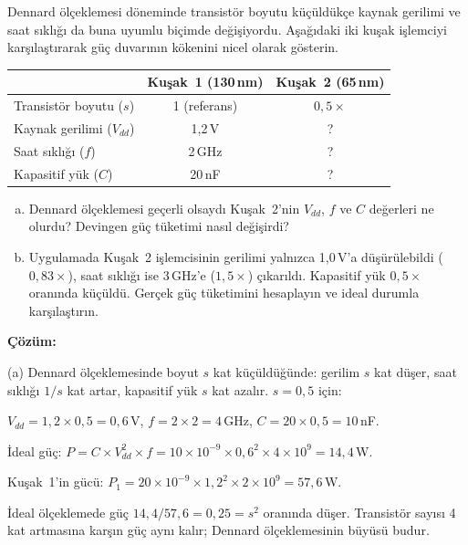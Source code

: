 \begin{ornek}[1.6]
\label{orn:dennard-guc-duvari}
Dennard ölçeklemesi döneminde transistör boyutu küçüldükçe kaynak gerilimi ve saat sıklığı da buna uyumlu biçimde değişiyordu. Aşağıdaki iki kuşak işlemciyi karşılaştırarak güç duvarının kökenini nicel olarak gösterin.

\begin{center}
\small
\begin{tabular}{lcc}
\toprule
& \textbf{Kuşak~1 (130\,nm)} & \textbf{Kuşak~2 (65\,nm)} \\
\midrule
Transistör boyutu ($s$)  & 1 (referans) & $0{,}5\times$ \\
Kaynak gerilimi ($V_{dd}$) & 1{,}2\,V & ? \\
Saat sıklığı ($f$) & 2\,GHz & ? \\
Kapasitif yük ($C$) & 20\,nF & ? \\
\bottomrule
\end{tabular}
\end{center}

\begin{enumerate}[(a)]
\item Dennard ölçeklemesi geçerli olsaydı Kuşak~2'nin $V_{dd}$, $f$ ve $C$ değerleri ne olurdu? Devingen güç tüketimi nasıl değişirdi?
\item Uygulamada Kuşak~2 işlemcisinin gerilimi yalnızca 1{,}0\,V'a düşürülebildi ($0{,}83\times$), saat sıklığı ise 3\,GHz'e ($1{,}5\times$) çıkarıldı. Kapasitif yük $0{,}5\times$ oranında küçüldü. Gerçek güç tüketimini hesaplayın ve ideal durumla karşılaştırın.
\end{enumerate}

\textbf{Çözüm:}

(a) Dennard ölçeklemesinde boyut $s$ kat küçüldüğünde: gerilim $s$ kat düşer, saat sıklığı $1/s$ kat artar, kapasitif yük $s$ kat azalır. $s = 0{,}5$ için:

$V_{dd} = 1{,}2 \times 0{,}5 = 0{,}6$\,V, \quad $f = 2 \times 2 = 4$\,GHz, \quad $C = 20 \times 0{,}5 = 10$\,nF.

İdeal güç: $P = C \times V_{dd}^2 \times f = 10 \times 10^{-9} \times 0{,}6^2 \times 4 \times 10^{9} = 14{,}4$\,W.

Kuşak~1'in gücü: $P_1 = 20 \times 10^{-9} \times 1{,}2^2 \times 2 \times 10^{9} = 57{,}6$\,W.

İdeal ölçeklemede güç \textbf{$14{,}4 / 57{,}6 = 0{,}25 = s^2$} oranında düşer. Transistör sayısı 4 kat artmasına karşın güç aynı kalır; Dennard ölçeklemesinin büyüsü budur.


\end{ornek}
